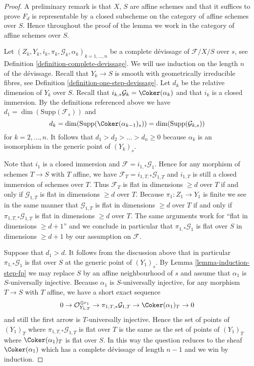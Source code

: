 \begin{proof}
A preliminary remark is that $X$, $S$ are affine schemes and that it
suffices to prove $F_d$ is representable by a closed subscheme on the
category of affine schemes over $S$. Hence throughout the proof of
the lemma we work in the category of affine schemes over $S$.

\medskip\noindent
Let $(Z_k, Y_k, i_k, \pi_k, \mathcal{G}_k, \alpha_k)_{k = 1, \ldots, n}$
be a complete d\'evissage of $\mathcal{F}/X/S$ over $s$, see
Definition \ref{definition-complete-devissage}.
We will use induction on the length $n$ of the d\'evissage.
Recall that $Y_k \to S$ is smooth with geometrically irreducible fibres, see
Definition \ref{definition-one-step-devissage}.
Let $d_k$ be the relative dimension of $Y_k$ over $S$.
Recall that $i_{k, *}\mathcal{G}_k = \Coker(\alpha_k)$ and
that $i_k$ is a closed immersion.
By the definitions referenced above we have
$d_1 = \dim(\text{Supp}(\mathcal{F}_s))$ and
$$
d_k = \dim(\text{Supp}(\Coker(\alpha_{k - 1})_s))
= \dim(\text{Supp}(\mathcal{G}_{k, s}))
$$
for $k = 2, \ldots, n$. It follows that $d_1 > d_2 > \ldots > d_n \geq 0$
because $\alpha_k$ is an isomorphism in the generic point of $(Y_k)_s$.

\medskip\noindent
Note that $i_1$ is a closed immersion and
$\mathcal{F} = i_{1, *}\mathcal{G}_1$.
Hence for any morphism of schemes $T \to S$ with $T$ affine,
we have $\mathcal{F}_T = i_{1, T, *}\mathcal{G}_{1, T}$ and
$i_{1, T}$ is still a closed immersion of schemes over $T$.
Thus $\mathcal{F}_T$ is flat in dimensions $\geq d$ over $T$
if and only if $\mathcal{G}_{1, T}$ is flat in dimensions $\geq d$ over $T$.
Because $\pi_1 : Z_1 \to Y_1$ is finite we see in the same manner that
$\mathcal{G}_{1, T}$ is flat in dimensions $\geq d$ over $T$
if and only if $\pi_{1, T, *}\mathcal{G}_{1, T}$ is flat in dimensions
$\geq d$ over $T$. The same arguments work for
``flat in dimensions $\geq d + 1$'' and we conclude in particular that
$\pi_{1, *}\mathcal{G}_1$ is flat over $S$ in dimensions $\geq d + 1$
by our assumption on $\mathcal{F}$.

\medskip\noindent
Suppose that $d_1 > d$. It follows from the discussion above that
in particular $\pi_{1, *}\mathcal{G}_1$ is flat over $S$ at
the generic point of $(Y_1)_s$. By
Lemma \ref{lemma-induction-step-fp}
we may replace $S$ by an affine neighbourhood of $s$ and assume that
$\alpha_1$ is $S$-universally injective. Because $\alpha_1$ is
$S$-universally injective, for any morphism $T \to S$ with $T$ affine,
we have a short exact sequence
$$
0 \to \mathcal{O}_{Y_{1, T}}^{\oplus r_1}
\to \pi_{1, T, *}\mathcal{G}_{1, T} \to \Coker(\alpha_1)_T \to 0
$$
and still the first arrow is $T$-universally injective. Hence the set
of points of $(Y_1)_T$ where $\pi_{1, T, *}\mathcal{G}_{1, T}$ is flat over
$T$ is the same as the set of points of $(Y_1)_T$ where
$\Coker(\alpha_1)_T$ is flat over $S$. In this way the question
reduces to the sheaf $\Coker(\alpha_1)$ which has a complete
d\'evissage of length $n - 1$ and we win by induction.


\end{proof}
